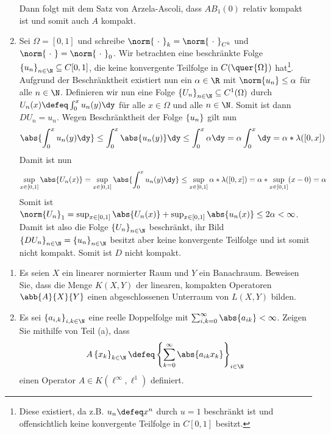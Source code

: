 \begin{exercisePage}
\begin{enumerate}[label=(zu \alph*), leftmargin=\zulength]
	Dann folgt mit dem Satz von Arzela-Ascoli, dass $A B_1(0)$ relativ kompakt ist und somit auch $A$ kompakt.
	\item Sei $\Omega = [0,1]$ und schreibe $\norm{\ \cdot \ }_k = \norm{\ \cdot \ }_{C^k}$ und $\norm{\ \cdot \ } = \norm{\ \cdot \ }_0$. Wir betrachten eine beschränkte Folge $\folge{u_n}{n \in \N} \subseteq C[0,1]$, die keine konvergente Teilfolge in $C(\quer{\Omega})$ hat\footnote{Diese existiert, da z.B. $u_n \defeq x^n$ durch $u = 1$ beschränkt ist und offensichtlich keine konvergente Teilfolge in $C[0,1]$ besitzt.}. Aufgrund der Beschränktheit existiert nun ein $\alpha \in \R$ mit $\norm{u_n} \le \alpha$ für alle $n \in \N$. Definieren wir nun eine Folge $\folge{U_n}{n \in \N} \subseteq C^1(\Omega)$ durch $U_n(x) \defeq \int_0^x u_n(y) \dy$ für alle $x \in \Omega$ und alle $n \in \N$. Somit ist dann $D U_n = u_n$. Wegen Beschränktheit der Folge $\left\{ u_n \right\}_{}$ gilt nun
	\begin{equation*}
		\abs{\int_0^x u_n(y) \dy} \le \int_0^x \abs{u_n(y)} \dy \le \int_0^x \alpha \dy = \alpha \int_0^x \dy = \alpha * \lambda([0,x])
	\end{equation*}
	Damit ist nun
	\begin{equation*}
		\sup_{x \in [0,1]} \abs{U_n(x)} 
		= \sup_{x \in [0,1]} \abs{\int_0^x u_n(y) \dy} 
		\le \sup_{x \in [0,1]} \alpha * \lambda([0,x]) 
		= \alpha * \sup_{x \in [0,1]} (x-0) = \alpha
	\end{equation*}
	Somit ist $\norm{U_n}_1 = \sup_{x \in [0,1]} \abs{U_n(x)} + \sup_{x \in [0,1]} \abs{u_n(x)} \le 2 \alpha < \infty$. Damit ist also die Folge $\folge{U_n}{n \in \N}$ beschränkt, ihr Bild $\folge{DU_n}{n \in \N} = \folge{u_n}{n \in \N}$ besitzt aber keine konvergente Teilfolge und ist somit nicht kompakt. Somit ist $D$ nicht kompakt.
\end{enumerate}

\begin{exercise}
	\begin{enumerate}
		\item Es seien $X$ ein linearer normierter Raum und $Y$ ein Banachraum. Beweisen Sie, dass die Menge $K(X,Y)$ der linearen, kompakten Operatoren $\abb{A}{X}{Y}$ einen abgeschlossenen Unterraum von $L(X,Y)$ bilden.
		\item Es sei $\folge{a_{i,k}}{i,k \in \N}$ eine reelle Doppelfolge mit $\sum_{i,k = 0}^\infty \abs{a_{ik}} < \infty$. Zeigen Sie mithilfe von Teil (a), dass 
		\begin{equation*}
			A \folge{x_k}{k \in \N} \defeq \folge{\sum_{k=0}^\infty \abs{a_{ik} x_k}}{i \in \N}
		\end{equation*}
		einen Operator $A \in K(\ell^\infty, \ell^1)$ definiert.
	\end{enumerate}
\end{exercise}


\end{exercisePage}
